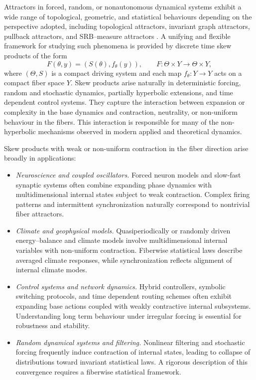 \documentclass[11pt,reqno]{amsart}
\theoremstyle{plain}
\newtheorem*{theorem A}{Theorem A}
\newtheorem*{theorem B}{Theorem B}
\newtheorem*{theorem C}{Theorem C}
\newtheorem*{theorem 1}{Theorem 1}
\newtheorem*{theorem 2}{Theorem 2}
\newtheorem*{theorem 3}{Theorem 3}
\numberwithin{equation}{section}
\begin{document}
Attractors in forced, random, or nonautonomous dynamical systems exhibit a wide range of
topological, geometric, and statistical behaviours depending on the perspective adopted,
including topological attractors, invariant graph attractors, pullback attractors, and
SRB--measure attractors
\cite{robinson1998dynamical,magal2005global}.
A unifying and flexible framework for studying such phenomena is provided by discrete time
skew products of the form
\begin{equation}\label{eq:skew}
F(\theta,y)=(S(\theta),f_\theta(y)),\qquad
F:\Theta\times Y\to\Theta\times Y,
\end{equation}
where $(\Theta,S)$ is a compact driving system and each map
$f_\theta:Y\to Y$ acts on a compact fiber space $Y$.
Skew products arise naturally in deterministic forcing, random and stochastic dynamics,
partially hyperbolic extensions, and time dependent control systems.
They capture the interaction between expansion or complexity in the base dynamics and
contraction, neutrality, or non-uniform behaviour in the fibers.
This interaction is responsible for many of the non-hyperbolic mechanisms observed in modern
applied and theoretical dynamics.


Skew products with weak or non-uniform contraction in the fiber direction arise broadly in
applications:

\begin{itemize}
\item \emph{Neuroscience and coupled oscillators.}
Forced neuron models and slow-fast synaptic systems often combine expanding phase dynamics
with multidimensional internal states subject to weak contraction.
Complex firing patterns and intermittent synchronization naturally correspond to nontrivial
fiber attractors.

\item \emph{Climate and geophysical models.}
Quasiperiodically or randomly driven energy--balance and climate models involve multidimensional
internal variables with non-uniform contraction.
Fiberwise statistical laws describe averaged climate responses, while synchronization reflects
alignment of internal climate modes.

\item \emph{Control systems and network dynamics.}
Hybrid controllers, symbolic switching protocols, and time dependent routing schemes often
exhibit expanding base actions coupled with weakly contractive internal subsystems.
Understanding long term behaviour under irregular forcing is essential for robustness and
stability.

\item \emph{Random dynamical systems and filtering.}
Nonlinear filtering and stochastic forcing frequently induce contraction of internal states,
leading to collapse of distributions toward invariant statistical laws.
A rigorous description of this convergence requires a fiberwise statistical framework.
\end{itemize}
\end{document}
